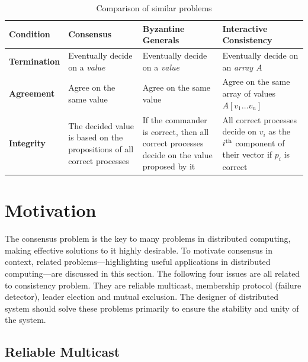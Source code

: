 \documentclass[12pt, a4paper]{article}
\begin{document}
\begin{table}[htp]
  \centering
  \begin{tabularx}{\linewidth}{%
    l%
    >{\raggedright\arraybackslash}X%
    >{\raggedright\arraybackslash}X%
    >{\raggedright\arraybackslash}X}
  \toprule
  Condition & Consensus & Byzantine Generals & Interactive Consistency \\
  \midrule
  \textbf{Termination} & Eventually decide on a \textit{value}
    & Eventually decide on a \textit{value}
    & Eventually decide on an \textit{array $A$} \\
  \addlinespace
  \textbf{Agreement} & Agree on the same value
    & Agree on the same value
    & Agree on the same array of values $A[v_{1} \ldots v_{n}]$ \\
  \addlinespace
  \textbf{Integrity}
    & The decided value is based on the propositions of all correct processes
    & If the commander is correct, then all correct processes decide on the
      value proposed by it
    & All correct processes decide on $v_{i}$ as the $i\textsuperscript{th}$
      component of their vector if $p_{i}$ is correct \\
  \bottomrule
\end{tabularx}
  \caption{Comparison of similar problems}
  \label{tab:dbtap}
\end{table}


\section{Motivation}
\label{sec:motivation}

The consensus problem is the key to many problems in distributed computing,
making effective solutions to it highly desirable\cite{fritzke2001consensus}. To
motivate consensus in context, related problems—highlighting useful applications
in distributed computing—are discussed in this section. The following four
issues are all related to consistency problem. They are reliable multicast,
membership protocol (failure detector), leader election and mutual exclusion.
The designer of distributed system should solve these problems primarily to
ensure the stability and unity of the system.

\subsection{Reliable Multicast}
\end{document}

